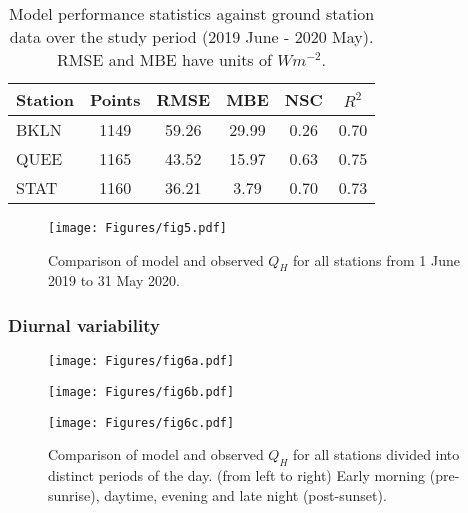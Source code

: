 \begin{table}[ht]
\centering
\caption{Model performance statistics against ground station data over the study period (2019 June - 2020 May). RMSE and MBE have units of $W m^{-2}$.}
	\renewcommand{\arraystretch}{1}%
    \begin{tabular}[t]{lccccc}
        \hline
        Station & Points & RMSE & MBE & NSC & $R^2$ \\
        \hline
        BKLN & 1149 & 59.26 & 29.99 & 0.26 & 0.70 \\
        QUEE & 1165 & 43.52 & 15.97 & 0.63 & 0.75 \\
        STAT & 1160 & 36.21 & 3.79 & 0.70 & 0.73 \\
        \hline
    \end{tabular}
    \label{tab:performance-stats}
\end{table}

\begin{figure}[ht!]
    \centering
        \texttt{[image: Figures/fig5.pdf]}
    \caption{Comparison of model and observed $Q_H$ for all stations from 1 June 2019 to 31 May 2020.}
    \label{fig:overall-scatter}
\end{figure}

\FloatBarrier

\subsubsection{Diurnal variability} \label{section:results-diurnal-variability}

\begin{figure}[!h]
    \centering
    \begin{minipage}{0.33\textwidth}
        \centering
        \texttt{[image: Figures/fig6a.pdf]}
    \end{minipage}\hfill
    \begin{minipage}{0.33\textwidth}
        \centering
        \texttt{[image: Figures/fig6b.pdf]}
    \end{minipage}\hfill
    \begin{minipage}{0.33\textwidth}
        \centering
        \texttt{[image: Figures/fig6c.pdf]}
    \end{minipage}\hfill
    \caption{Comparison of model and observed $Q_H$ for all stations divided into distinct periods of the day. (from left to right) Early morning (pre-sunrise), daytime, evening and late night (post-sunset).}
    \label{fig:diurnal-seasonal-scatter} 
\end{figure}

